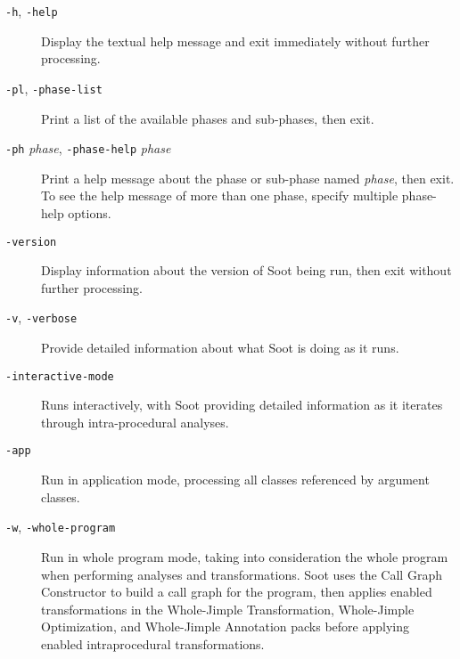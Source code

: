 \documentclass{article}
\begin{document}
\begin{description}

  \item[
  {\tt -h}, 
  {\tt -help}]

Display the textual help message and exit immediately without
further processing.



  \item[
  {\tt -pl}, 
  {\tt -phase-list}]

Print a list of the available phases and sub-phases, then exit.



  \item[
  {\tt -ph}{ \it phase}, 
  {\tt -phase-help}{ \it phase}]

Print a help message about the phase or sub-phase named
{\it phase}, then exit.  To see the help message of
more than one phase, specify multiple phase-help options.



  \item[
  {\tt -version}]

Display information about the version of Soot being run, then
exit without further processing.



  \item[
  {\tt -v}, 
  {\tt -verbose}]

Provide detailed information about what Soot is doing as it runs.



  \item[
  {\tt -interactive-mode}]

Runs interactively, with Soot providing detailed information as it iterates through intra-procedural analyses.



  \item[
  {\tt -app}]


\par

Run in application mode, processing all classes referenced by
argument classes.



  \item[
  {\tt -w}, 
  {\tt -whole-program}]


\par

Run in whole program mode, taking into consideration the whole
program when performing analyses and transformations. Soot
uses the Call Graph Constructor to build a call graph for the
program, then applies enabled transformations in the Whole-Jimple
Transformation, Whole-Jimple Optimization, and Whole-Jimple
Annotation packs before applying enabled intraprocedural
transformations.


\end{description}
\end{document}
